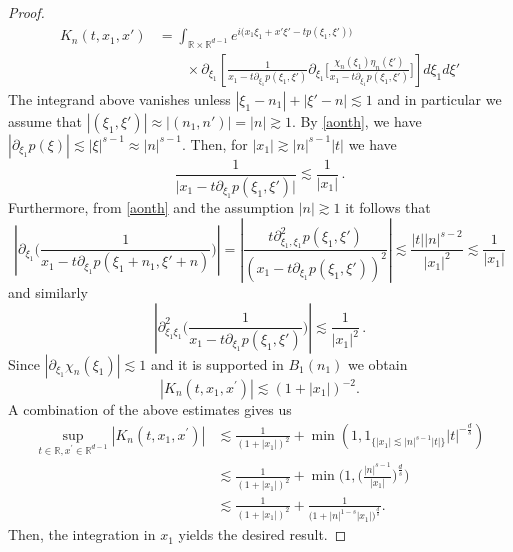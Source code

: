 \documentclass[10pt,leqno]{amsart}
\newcommand{\R}{\mathbb{R}}
\numberwithin{equation}{section}
\begin{document}
\begin{proof}
\begin{align*}
K_n(t,x_1 ,x')
&= \int_{\R \times \R^{d-1}}  e^{i\big(x_1 \xi_1 +x' \xi'-t p (\xi_1, \xi') \big)} 
\\
&\qquad \times
\partial_{\xi_{1}} \left[ \frac{1}{x_1 - t\partial_{\xi_{1}}p(\xi_1, \xi')} 
\partial_{\xi_{1}}\Big[\frac{\chi_n(\xi_1) \eta_n (\xi')}{x_1 - t\partial_{\xi_{1}}p(\xi_1, \xi')} \Big]\right] d\xi_1 d\xi'
\end{align*}
The integrand above vanishes unless \(|\xi_{1}-n_{1}|+|\xi'-n|\lesssim1\) and in particular we assume that \(|(\xi_{1},\xi')|\approx|(n_{1},n')|=|n|\gtrsim1\).
By \eqref{aonth}, we have 
 $|\partial_{\xi_{1}}p(\xi)| \lesssim | \xi |^{s-1}\approx |n|^{s-1}$. Then, for  \(|x_{1}|\gtrsim|n|^{s-1}|t|\) we have 
\begin{equation*}
\frac{1}{\big|x_1 - t\partial_{\xi_{1}}p(\xi_1, \xi')\big|}\lesssim\frac{1}{|x_{1}|} \,.
\end{equation*}
Furthermore, from \eqref{aonth} and the assumption $|n| \gtrsim 1$ it follows that
\begin{equation*}
\left| \partial_{\xi_1} \Big( \frac{1}{x_1 - t\partial_{\xi_{1}}p(\xi_1+n_1, \xi' + n)} \Big) \right| =
\left| \frac{t\partial_{\xi_{1},\xi_{1}}^{2}p(\xi_1, \xi')}{(x_1 - t\partial_{\xi_{1}}p(\xi_1, \xi'))^2} \right|
\lesssim \frac{|t||n|^{s-2}}{|x_1|^{2}}
 \lesssim \frac{1}{|x_1|}
\end{equation*}
and similarly
$$
\left| \partial^2_{\xi_1\xi_1} \Big( \frac{1}{x_1 - t\partial_{\xi_{1}}p(\xi_1, \xi')} \Big) \right|
 \lesssim \frac{1}{|x_1|^2} \,.
$$
Since $|\partial_{\xi_1} \chi_n(\xi_1)| \lesssim 1$ and it is supported in \(B_{1}(n_{1})\) we obtain
$$|K_n(t,x_1 ,x^\prime )|\lesssim    (1+ |x_1| )^{-2}.$$
A combination of the above estimates gives us
\begin{align*}
\sup_{t\in \R , x^\prime \in \R^{d-1}} |K_n (t,x_1, x^\prime)|& \lesssim \frac{1}{(1+ |x_1|)^{2}}  +\min (1 , 1_{\{|x_1| \lesssim |n|^{s - 1} |t|\} }  |t|^{-\frac{d}{s}})\\
& \lesssim \frac{1}{(1+ |x_1|)^{2}}  + \min \bigg(1 ,  \bigg(\frac{|n|^{s - 1}}{|x_1|}\bigg)^{\frac{d}{s} } \bigg)\\
&\lesssim \frac{1}{(1+ |x_1|)^{2}}  +\frac{1}{\Big(1+|n|^{1-s}|x_1|\Big)^{\frac{d}{s}}}
.
\end{align*}
Then, the integration in $x_1$ yields the desired result.
\end{proof}
\end{document}
